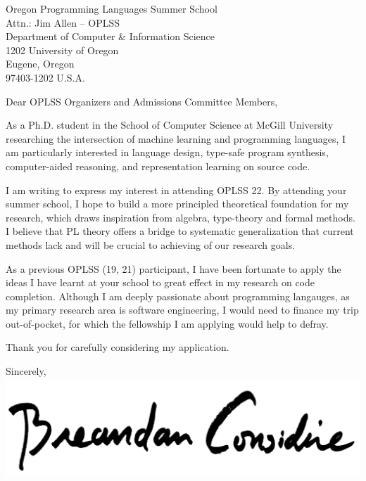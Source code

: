 \documentclass{letter}
\begin{document}
    \begin{letter}{Oregon Programming Languages Summer School\\Attn.: Jim Allen -- OPLSS\\Department of Computer \& Information Science\\1202 University of Oregon\\Eugene, Oregon\\97403-1202 U.S.A.}
        \opening{Dear OPLSS Organizers and Admissions Committee Members,}
        As a Ph.D. student in the School of Computer Science at McGill University researching the intersection of machine learning and programming languages, I am particularly interested in language design, type-safe program synthesis, computer-aided reasoning, and representation learning on source code.

        I am writing to express my interest in attending OPLSS \textsc{}22. By attending your summer school, I hope to build a more principled theoretical foundation for my research, which draws inspiration from algebra, type-theory and formal methods. I believe that PL theory offers a bridge to systematic generalization that current methods lack and will be crucial to achieving of our research goals.

        As a previous OPLSS (\textsc{}19, \textsc{}21) participant, I have been fortunate to apply the ideas I have learnt at your school to great effect in my research on code completion. Although I am deeply passionate about programming langauges, as my primary research area is software engineering, I would need to finance my trip out-of-pocket, for which the fellowship I am applying would help to defray.

        Thank you for carefully considering my application.

        \closing{Sincerely,\\
        \includegraphics[scale=0.06]{signature.png}\\
        }
    \end{letter}
\end{document}
